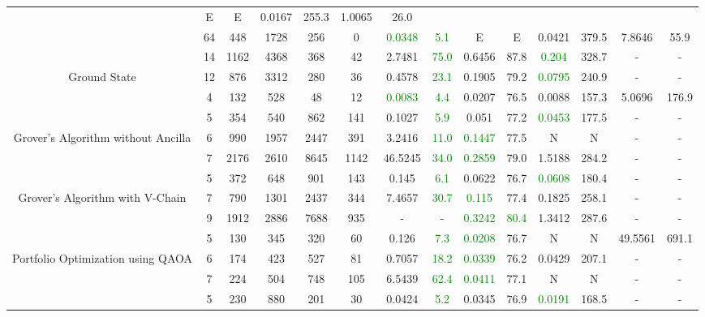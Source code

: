 \begin{table}[htb]
{\begin{tabular}{|c|c|c|c|c|c|c|c|c|c|c|c|c|c|}
 & E & E
 & 0.0167 & 255.3
 & 1.0065 & 26.0
 \\
 & 
64 & 448 & 1728 & 256 & 0
 & \textcolor{green}{0.0348} & \textcolor{green}{5.1}
 & E & E
 & 0.0421 & 379.5
 & 7.8646 & 55.9
 \\
\hline
 & 
14 & 1162 & 4368 & 368 & 42
 & 2.7481 & \textcolor{green}{75.0}
 & 0.6456 & 87.8
 & \textcolor{green}{0.204} & 328.7
 & - & -
 \\
Ground State & 
12 & 876 & 3312 & 280 & 36
 & 0.4578 & \textcolor{green}{23.1}
 & 0.1905 & 79.2
 & \textcolor{green}{0.0795} & 240.9
 & - & -
 \\
 & 
4 & 132 & 528 & 48 & 12
 & \textcolor{green}{0.0083} & \textcolor{green}{4.4}
 & 0.0207 & 76.5
 & 0.0088 & 157.3
 & 5.0696 & 176.9
 \\
\hline
 & 
5 & 354 & 540 & 862 & 141
 & 0.1027 & \textcolor{green}{5.9}
 & 0.051 & 77.2
 & \textcolor{green}{0.0453} & 177.5
 & - & -
 \\
Grover's Algorithm without Ancilla & 
6 & 990 & 1957 & 2447 & 391
 & 3.2416 & \textcolor{green}{11.0}
 & \textcolor{green}{0.1447} & 77.5
 & N & N 
 & - & -
 \\
 & 
7 & 2176 & 2610 & 8645 & 1142
 & 46.5245 & \textcolor{green}{34.0}
 & \textcolor{green}{0.2859} & 79.0
 & 1.5188 & 284.2
 & - & -
 \\
\hline
 & 
5 & 372 & 648 & 901 & 143
 & 0.145 & \textcolor{green}{6.1}
 & 0.0622 & 76.7
 & \textcolor{green}{0.0608} & 180.4
 & - & -
 \\
Grover's Algorithm with V-Chain & 
7 & 790 & 1301 & 2437 & 344
 & 7.4657 & \textcolor{green}{30.7}
 & \textcolor{green}{0.115} & 77.4
 & 0.1825 & 258.1
 & - & -
 \\
 & 
9 & 1912 & 2886 & 7688 & 935
 & - & -
 & \textcolor{green}{0.3242} & \textcolor{green}{80.4}
 & 1.3412 & 287.6
 & - & -
 \\
\hline
 & 
5 & 130 & 345 & 320 & 60
 & 0.126 & \textcolor{green}{7.3}
 & \textcolor{green}{0.0208} & 76.7
 & N & N 
 & 49.5561 & 691.1
 \\
Portfolio Optimization using QAOA & 
6 & 174 & 423 & 527 & 81
 & 0.7057 & \textcolor{green}{18.2}
 & \textcolor{green}{0.0339} & 76.2
 & 0.0429 & 207.1
 & - & -
 \\
 & 
7 & 224 & 504 & 748 & 105
 & 6.5439 & \textcolor{green}{62.4}
 & \textcolor{green}{0.0411} & 77.1
 & N & N 
 & - & -
 \\
\hline
 & 
5 & 230 & 880 & 201 & 30
 & 0.0424 & \textcolor{green}{5.2}
 & 0.0345 & 76.9
 & \textcolor{green}{0.0191} & 168.5
 & - & -
 \\

\end{tabular}}
\end{table}
